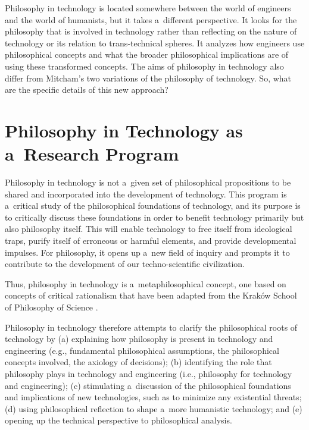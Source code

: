 Philosophy in technology is located somewhere between the world of engineers and the world of humanists, but it takes a~different perspective. It looks for the philosophy that is involved in technology rather than reflecting on the nature of technology or its relation to trans-technical spheres. It analyzes how engineers use philosophical concepts and what the broader philosophical implications are of using these transformed concepts. The aims of philosophy in technology also differ from Mitcham's two variations of the philosophy of technology. So, what are the specific details of this new approach?



\section{Philosophy in Technology as a~Research Program}

Philosophy in technology is not a~given set of philosophical propositions to be shared and incorporated into the development of technology. This program is a~critical study of the philosophical foundations of technology, and its purpose is to critically discuss these foundations in order to benefit technology primarily but also philosophy itself. This will enable technology to free itself from ideological traps, purify itself of erroneous or harmful elements, and provide developmental impulses. For philosophy, it opens up a~new field of inquiry and prompts it to contribute to the development of our techno-scientific civilization.



Thus, philosophy in technology is a~metaphilosophical concept, one based on concepts of critical rationalism that have been adapted from the Kraków School of Philosophy of Science 
\parencite[][]{polak_krakow_2022}.%




Philosophy in technology therefore attempts to clarify the philosophical roots of technology by (a) explaining how philosophy is present in technology and engineering (e.g., fundamental philosophical assumptions, the philosophical concepts involved, the axiology of decisions); (b) identifying the role that philosophy plays in technology and engineering (i.e., philosophy for technology and engineering); (c) stimulating a~discussion of the philosophical foundations and implications of new technologies, such as to minimize any existential threats; (d) using philosophical reflection to shape a~more humanistic technology; and (e) opening up the technical perspective to philosophical analysis.



